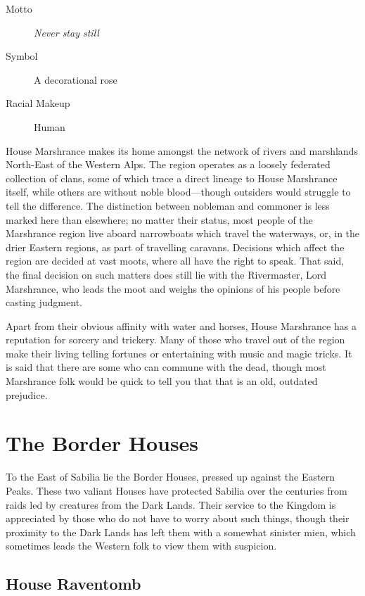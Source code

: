 \documentclass[10pt,twoside,openright,a4paper,twocolumn]{book}
\begin{document}
\begin{description}
\item[Motto] \textit{Never stay still}

\item[Symbol] A decorational rose

\item[Racial Makeup] Human
\end{description}

\noindent
House Marshrance makes its home amongst the network of rivers and marshlands
North-East of the Western Alps.  The region operates as a loosely federated
collection of clans, some of which trace a direct lineage to House Marshrance
itself, while others are without noble blood---though outsiders would struggle to
tell the difference.  The distinction between nobleman and commoner is less marked
here than elsewhere; no matter their status, most people of the Marshrance region
live aboard narrowboats which travel the waterways, or, in the drier Eastern regions,
as part of travelling caravans.  Decisions which affect the region are decided at vast
moots, where all have the right to speak.  That said, the final decision on such matters
does still lie with the Rivermaster, Lord Marshrance, who leads the moot and weighs the opinions of his people before casting judgment.

Apart from their obvious affinity with water and horses, House Marshrance has a
reputation for sorcery and trickery.  Many of those who travel out of the region make
their living telling fortunes or entertaining with music and magic tricks.  It is said that
there are some who can commune with the dead, though most Marshrance folk would
be quick to tell you that that is an old, outdated prejudice.

\section{The Border Houses}

To the East of Sabilia lie the Border Houses, pressed up against the Eastern
Peaks.  These two valiant Houses have protected Sabilia over the centuries from
raids led by creatures from the Dark Lands.  Their service to the Kingdom is
appreciated by those who do not have to worry about such things, though their
proximity to the Dark Lands has left them with a somewhat sinister mien, which
sometimes leads the Western folk to view them with suspicion.

\subsection*{House Raventomb}
\end{document}
